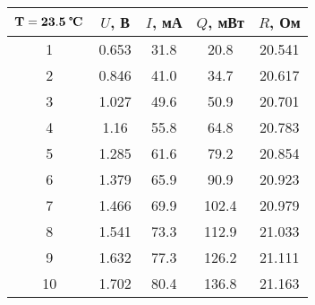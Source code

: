\begin{tabular}{ccccc}
\toprule
$\mathbf{T = 23.5}\;\textbf{\textcelsius}$ & $U$, В & $I$, мА & $Q$, мВт & $R$, Ом \\
\midrule
1 & 0.653 & 31.8 & 20.8 & 20.541 \\
2 & 0.846 & 41.0 & 34.7 & 20.617 \\
3 & 1.027 & 49.6 & 50.9 & 20.701 \\
4 & 1.16 & 55.8 & 64.8 & 20.783 \\
5 & 1.285 & 61.6 & 79.2 & 20.854 \\
6 & 1.379 & 65.9 & 90.9 & 20.923 \\
7 & 1.466 & 69.9 & 102.4 & 20.979 \\
8 & 1.541 & 73.3 & 112.9 & 21.033 \\
9 & 1.632 & 77.3 & 126.2 & 21.111 \\
10 & 1.702 & 80.4 & 136.8 & 21.163 \\
\bottomrule
\end{tabular}
